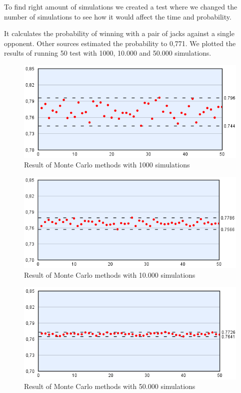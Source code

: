 To find right amount of simulations we created a test where we changed the number of simulations to see how it would affect the time and probability.

It calculates the probability of winning with a pair of jacks against a single opponent. Other sources estimated the probability to 0,771.
We plotted the results of running 50 test with 1000, 10.000 and 50.000 simulations. 

\begin{figure}[h!]
  \center
    \includegraphics[scale=0.775]{images/MonteCarlo/1k.png}
  \caption{Result of Monte Carlo methods with 1000 simulations}
\end{figure}

\begin{figure}[h!]
  \center
    \includegraphics[scale=0.775]{images/MonteCarlo/10k.png}
  \caption{Result of Monte Carlo methods with 10.000 simulations}
\end{figure}

\begin{figure}[h!]
  \center
    \includegraphics[scale=0.775]{images/MonteCarlo/50k.png}
  \caption{Result of Monte Carlo methods with 50.000 simulations}
\end{figure}

